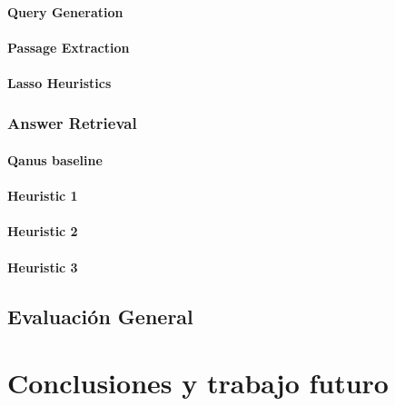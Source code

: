 \subsubsection{Query Generation}
\subsubsection{Passage Extraction}
\subsubsection{Lasso Heuristics}
\subsection{Answer Retrieval}
\subsubsection{Qanus baseline}
\subsubsection{Heuristic 1}
\subsubsection{Heuristic 2}
\subsubsection{Heuristic 3}
\section{Evaluación General}
\chapter{Conclusiones y trabajo futuro}

